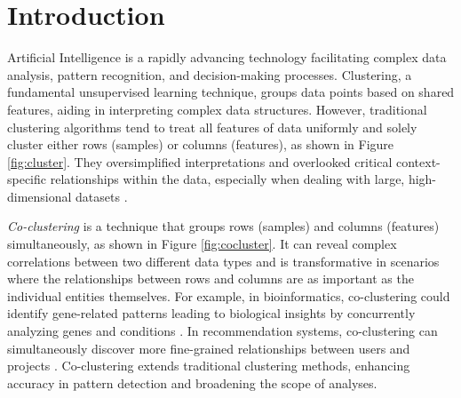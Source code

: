 
\section{Introduction}
Artificial Intelligence is a rapidly advancing technology facilitating complex data analysis, pattern recognition, and decision-making processes. Clustering, a fundamental unsupervised learning technique, groups data points based on shared features, aiding in interpreting complex data structures. However, traditional clustering algorithms \cite{zhang2023AdaptiveGraphConvolution, wu2023EffectiveClusteringStructured} tend to treat all features of data uniformly and solely cluster either rows (samples) or columns (features),  as shown in Figure \ref{fig:cluster}. They oversimplified interpretations and overlooked critical context-specific relationships within the data, especially when dealing with large, high-dimensional datasets \cite{chen2023FastFlexibleBipartite, zhao2023MultiviewCoclusteringMultisimilarity, kumar2023CoclusteringBasedMethods}.

\textit{Co-clustering} \cite{kluger2003SpectralBiclusteringMicroarray, yan2017CoclusteringMultidimensionalBig} is a technique that groups rows (samples) and columns (features) simultaneously, as shown in Figure \ref{fig:cocluster}. It can reveal complex correlations between two different data types and is transformative in scenarios where the relationships between rows and columns are as important as the individual entities themselves. For example, in bioinformatics, co-clustering could identify gene-related patterns leading to biological insights by concurrently analyzing genes and conditions \cite{higham2007SpectralClusteringIts, kluger2003SpectralBiclusteringMicroarray, zhao2012BiclusteringAnalysisPattern}. In recommendation systems, co-clustering can simultaneously discover more fine-grained relationships between users and projects \cite{dhillon2007WeightedGraphCuts, chen2023ParallelNonNegativeMatrix}. Co-clustering extends traditional clustering methods, enhancing accuracy in pattern detection and broadening the scope of analyses.

